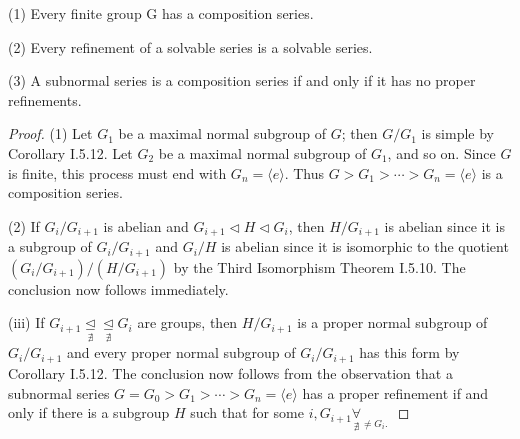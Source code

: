\begin{theorem}
    (1) Every finite group G has a composition series.

    (2) Every refinement of a solvable series is a solvable series.

    (3) A subnormal series is a composition series if and only if it has no proper refinements.

    \begin{proof}
        (1) Let $G_1$ be a maximal normal subgroup of $G$; then $G / G_1$ is simple by Corollary I.5.12. Let $G_2$ be a maximal normal subgroup of $G_1$, and so on. Since $G$ is finite, this process must end with $G_n=\langle e\rangle$. Thus $G>G_1>\cdots>G_n=\langle e\rangle$ is a composition series.

        (2) If $G_i / G_{i+1}$ is abelian and $G_{i+1} \triangleleft H \triangleleft G_i$, then $H / G_{i+1}$ is abelian since it is a subgroup of $G_i / G_{i+1}$ and $G_i / H$ is abelian since it is isomorphic to the quotient $\left(G_i / G_{i+1}\right) /\left(H / G_{i+1}\right)$ by the Third Isomorphism Theorem I.5.10. The conclusion now follows immediately.

        (iii) If $G_{i+1} \underset{\nexists}{\unlhd} \underset{\nexists}{\unlhd} G_i$ are groups, then $H / G_{i+1}$ is a proper normal subgroup of $G_i / G_{i+1}$ and every proper normal subgroup of $G_i / G_{i+1}$ has this form by Corollary I.5.12. The conclusion now follows from the observation that a subnormal series $G=G_0>G_1>\cdots>G_n=\langle e\rangle$ has a proper refinement if and only if there is a subgroup $H$ such that for some $i, G_{i+1} \underset{\nexists}{\forall} \underset{\neq G_i \text {. }}{ }$
    \end{proof}
\end{theorem}

